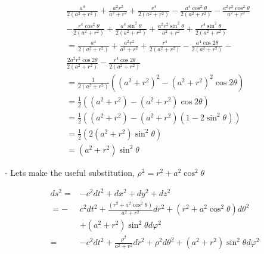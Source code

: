 \begin{equation}
    \begin{aligned}
         & \frac{a^4}{2\left(a^2+r^2\right)}+\frac{a^2 r^2}{a^2+r^2}+\frac{r^4}{2\left(a^2+r^2\right)}-\frac{a^4 \cos ^2 \theta}{2\left(a^2+r^2\right)}-\frac{a^2 r^2 \cos ^2 \theta}{a^2+r^2}        \\
         & -\frac{r^4 \cos ^2 \theta}{2\left(a^2+r^2\right)}+\frac{a^4 \sin ^2 \theta}{2\left(a^2+r^2\right)}+\frac{a^2 r^2 \sin ^2 \theta}{a^2+r^2}+\frac{r^4 \sin ^2 \theta}{2\left(a^2+r^2\right)} \\
         & =\frac{a^4}{2\left(a^2+r^2\right)}+\frac{a^2 r^2}{a^2+r^2}+\frac{r^4}{2\left(a^2+r^2\right)}-\frac{a^4 \cos 2 \theta}{2\left(a^2+r^2\right)}-                                              \\
         & \frac{2 a^2 r^2 \cos 2 \theta}{2\left(a^2+r^2\right)}-\frac{r^4 \cos 2 \theta}{2\left(a^2+r^2\right)}                                                                                      \\
         & =\frac{1}{2\left(a^2+r^2\right)}\left(\left(a^2+r^2\right)^2-\left(a^2+r^2\right)^2 \cos 2 \theta\right)                                                                                   \\
         & =\frac{1}{2}\left(\left(a^2+r^2\right)-\left(a^2+r^2\right) \cos 2 \theta\right)                                                                                                           \\
         & =\frac{1}{2}\left(\left(a^2+r^2\right)-\left(a^2+r^2\right)\left(1-2 \sin ^2 \theta\right)\right)                                                                                          \\
         & =\frac{1}{2}\left(2\left(a^2+r^2\right) \sin ^2 \theta\right)                                                                                                                              \\
         & =\left(a^2+r^2\right) \sin ^2 \theta
    \end{aligned}
\end{equation}

- Lets make the useful substitution, $\rho^2=r^2+a^2 \cos ^2 \theta$


\begin{align}
    d s^2= & -c^2 d t^2+d x^2+d y^2+d z^2                                                                                       \\
    =-     & c^2 d t^2+\frac{\left(r^2+a^2 \cos ^2 \theta\right)}{a^2+r^2} d r^2+\left(r^2+a^2 \cos ^2 \theta\right) d \theta^2 \\
           & +\left(a^2+r^2\right) \sin ^2 \theta d \varphi^2                                                                   \\
    =      & -c^2 d t^2+\frac{\rho^2}{a^2+r^2} d r^2+\rho^2 d \theta^2+\left(a^2+r^2\right) \sin ^2 \theta d \varphi^2
\end{align}


